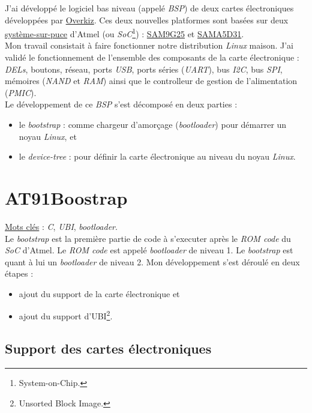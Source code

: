 \documentclass[a4paper]{article}
\begin{document}
J'ai développé le logiciel bas niveau (appelé \textit{BSP}) de deux cartes électroniques développées par \href{http://www.overkiz.com/}{Overkiz}. Ces deux nouvelles platformes sont basées sur deux \href{https://fr.wikipedia.org/wiki/Syst\%C3\%A8me_sur_une_puce}{système-sur-puce} d'Atmel (ou \textit{SoC}\footnote{System-on-Chip.}) : \href{http://www.atmel.com/devices/SAM9G25.aspx}{SAM9G25} et \href{http://www.atmel.com/products/microcontrollers/arm/sama5.aspx}{SAMA5D31}.\\

Mon travail consistait à faire fonctionner notre distribution \textit{Linux} maison. J'ai validé le fonctionnement de l'ensemble des composants de la carte électronique : \textit{DELs}, boutons, réseau, ports \textit{USB}, ports séries (\textit{UART}), bus \textit{I2C}, bus \textit{SPI}, mémoires (\textit{NAND} et \textit{RAM}) ainsi que le controlleur de gestion de l'alimentation (\textit{PMIC}).\\

Le développement de ce \textit{BSP} s'est décomposé en deux parties :
\begin{itemize}
\item le \textit{bootstrap} : comme chargeur d'amorçage (\textit{bootloader}) pour démarrer un noyau \textit{Linux}, et
\item le \textit{device-tree} : pour définir la carte électronique au niveau du noyau \textit{Linux}.
\end{itemize}

\section{AT91Boostrap}

\underline{Mots clés} : \textit{C}, \textit{UBI}, \textit{bootloader}.\\

Le \textit{bootstrap} est la première partie de code à s'executer après le \textit{ROM code} du \textit{SoC} d'Atmel. Le \textit{ROM code} est appelé \textit{bootloader} de niveau 1. Le \textit{bootstrap} est quant à lui un \textit{bootloader} de niveau 2. Mon développement s'est déroulé en deux étapes :
\begin{itemize}
\item ajout du support de la carte électronique et
\item ajout du support d'UBI\footnote{Unsorted Block Image.}.
\end{itemize}

\subsection{Support des cartes électroniques}
\end{document}
